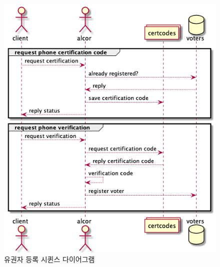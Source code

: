 \documentclass[8pt,a4paper,left=8mm,right=8mm,top=10mm,bottom=10mm]{article}
\begin{document}
    \begin{figure}[h]
        \begin{center}
            \includegraphics[width=14cm]{client-register}
            \caption{유권자 등록 시퀸스 다이어그램}
        \end{center}
    \end{figure}
\end{document}
